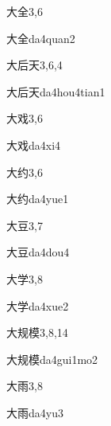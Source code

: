 \begin{entry}{大全}{3,6}
  \begin{phonetics}{大全}{da4quan2}
  \end{phonetics}
\end{entry}

\begin{entry}{大后天}{3,6,4}
  \begin{phonetics}{大后天}{da4hou4tian1}
  \end{phonetics}
\end{entry}

\begin{entry}{大戏}{3,6}
  \begin{phonetics}{大戏}{da4xi4}
  \end{phonetics}
\end{entry}

\begin{entry}{大约}{3,6}
  \begin{phonetics}{大约}{da4yue1}
  \end{phonetics}
\end{entry}

\begin{entry}{大豆}{3,7}
  \begin{phonetics}{大豆}{da4dou4}
  \end{phonetics}
\end{entry}

\begin{entry}{大学}{3,8}
  \begin{phonetics}{大学}{da4xue2}
  \end{phonetics}
\end{entry}

\begin{entry}{大规模}{3,8,14}
  \begin{phonetics}{大规模}{da4gui1mo2}
  \end{phonetics}
\end{entry}

\begin{entry}{大雨}{3,8}
  \begin{phonetics}{大雨}{da4yu3}
  \end{phonetics}
\end{entry}

